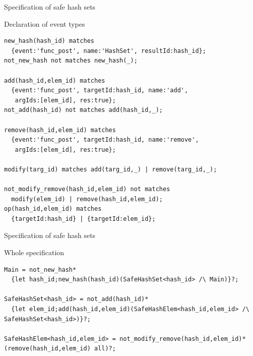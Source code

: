 \documentclass[10pt,usenames,dvipsnames]{beamer}
\begin{document}
\begin{frame}[fragile]{Specification of safe hash sets}
  \begin{block}{Declaration of event types}
    \begin{lstlisting}[basicstyle=\ttfamily\scriptsize]
new_hash(hash_id) matches
  {event:'func_post', name:'HashSet', resultId:hash_id};
not_new_hash not matches new_hash(_);

add(hash_id,elem_id) matches
  {event:'func_post', targetId:hash_id, name:'add',
   argIds:[elem_id], res:true};
not_add(hash_id) not matches add(hash_id,_);

remove(hash_id,elem_id) matches
  {event:'func_post', targetId:hash_id, name:'remove',
   argIds:[elem_id], res:true};

modify(targ_id) matches add(targ_id,_) | remove(targ_id,_);

not_modify_remove(hash_id,elem_id) not matches
  modify(elem_id) | remove(hash_id,elem_id);
op(hash_id,elem_id) matches
  {targetId:hash_id} | {targetId:elem_id};      
    \end{lstlisting}
  \end{block}
\end{frame}


\begin{frame}[fragile]{Specification of safe hash sets}
  \begin{block}{Whole specification}
    \begin{lstlisting}[basicstyle=\ttfamily\scriptsize]
Main = not_new_hash*
  {let hash_id;new_hash(hash_id)(SafeHashSet<hash_id> /\ Main)}?;

SafeHashSet<hash_id> = not_add(hash_id)*
  {let elem_id;add(hash_id,elem_id)(SafeHashElem<hash_id,elem_id> /\ SafeHashSet<hash_id>)}?;

SafeHashElem<hash_id,elem_id> = not_modify_remove(hash_id,elem_id)* (remove(hash_id,elem_id) all)?;
    \end{lstlisting}
  \end{block}
\end{frame}

\end{document}
